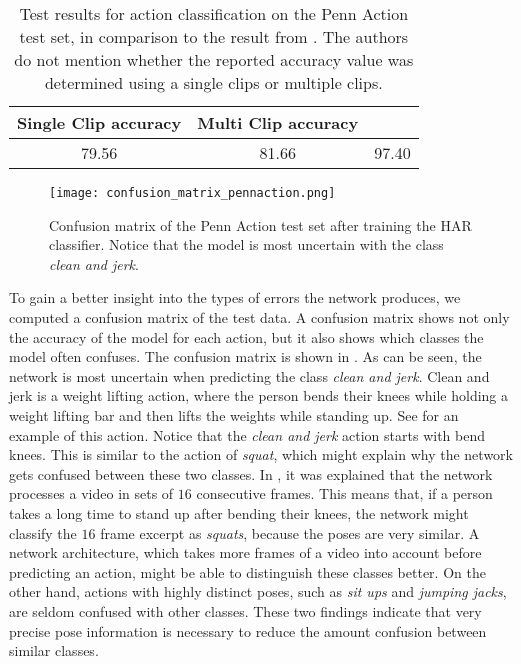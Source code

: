 \begin{table}[]
    \small
    \centering
    \begin{tabular}{|c|c|c|}
    \hline
        \textbf{Single Clip accuracy} & \textbf{Multi Clip accuracy} & \cite{luvizon_2d/3d_2018}\\ \hline
        79.56 & 81.66 & 97.40 \\ \hline
    \end{tabular}
    \caption{Test results for action classification on the Penn Action test set, in comparison to the result from \cite{luvizon_2d/3d_2018}. The authors do not mention whether the reported accuracy value was determined using a single clips or multiple clips.}
    \label{tab:pennaction_test_results}
\end{table}

\begin{figure}[htb!]
    \centering
    \texttt{[image: confusion\_matrix\_pennaction.png]}
    \caption{Confusion matrix of the Penn Action test set after training the HAR classifier. Notice that the model is most uncertain with the class \textit{clean and jerk}.}
    \label{fig:cm-pennaction}
\end{figure}

To gain a better insight into the types of errors the network produces, we computed a confusion matrix of the test data.
A confusion matrix shows not only the accuracy of the model for each action, but it also shows which classes the model often confuses.
The confusion matrix is shown in .
As can be seen, the network is most uncertain when predicting the class \textit{clean and jerk}.
Clean and jerk is a weight lifting action, where the person bends their knees while holding a weight lifting bar and then lifts the weights while standing up.
See  for an example of this action.
Notice that the \textit{clean and jerk} action starts with bend knees.
This is similar to the action of \textit{squat}, which might explain why the network gets confused between these two classes.
In , it was explained that the network processes a video in sets of $16$ consecutive frames.
This means that, if a person takes a long time to stand up after bending their knees, the network might classify the $16$ frame excerpt as \textit{squats}, because the poses are very similar.
A network architecture, which takes more frames of a video into account before predicting an action, might be able to distinguish these classes better.
On the other hand, actions with highly distinct poses, such as \textit{sit ups} and \textit{jumping jacks}, are seldom confused with other classes.
These two findings indicate that very precise pose information is necessary to reduce the amount confusion between similar classes.

